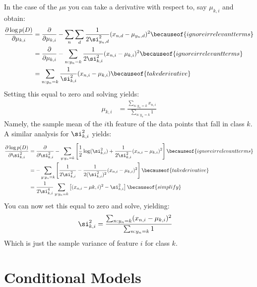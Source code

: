 In the case of the $\mu$s you can take a derivative with respect to,
say $\mu_{k,i}$ and obtain:
%
\begin{align}
   \frac {\partial \log p(D)} {\partial \mu_{k,i}}
&= \frac {\partial} {\partial \mu_{k,i}}
     - \sum_n \sum_d \frac 1 {2 \si_{y_n,d}^2} (x_{n,d} - \mu_{y_n,d})^2
   \becauseof{ignore irrelevant terms} \\
&= \frac {\partial} {\partial \mu_{k,i}}
     - \sum_{n:y_n=k} \frac 1 {2 \si_{k,i}^2} (x_{n,i} - \mu_{k,i})^2
   \becauseof{ignore irrelevant terms} \\
&= \sum_{n:y_n=k} \frac 1 {\si_{k,i}^2} (x_{n,i} - \mu_{k,i})
   \becauseof{take derivative}
\end{align}
%
Setting this equal to zero and solving yields:
%
\begin{align}
  \mu_{k,i} &= \frac {\sum_{n:y_n=k} x_{n,i}} {\sum_{n:y_n=k} 1}
\end{align}
%
Namely, the sample mean of the $i$th feature of the data points that
fall in class $k$.  A similar analysis for $\si_{k,i}^2$ yields:
%
\begin{align}
   \frac {\partial \log p(D)} {\partial \si^2_{k,i}}
&= \frac {\partial} {\partial \si^2_{k,i}}
     - \sum_{y:y_n=k} \left[ \frac 1 2 \log(\si_{k,i}^2) +
                            \frac 1 {2 \si_{k,i}^2} (x_{n,i} - \mu_{k,i})^2\right]
   \becauseof{ignore irrelevant terms} \\
&= - \sum_{y:y_n=k} \left[
       \frac 1 {2 \si_{k,i}^2}
     - \frac 1 {2 (\si_{k,i}^2)^2} (x_{n,i} - \mu_{k,i})^2 \right]
   \becauseof{take derivative} \\
&= \frac 1 {2 \si_{k,i}^4} \sum_{y:y_n=k} \left[ (x_{n,i} - \mu{k,i})^2 - \si_{k,i}^2 \right]
   \becauseof{simplify}
\end{align}
%
You can now set this equal to zero and solve, yielding:
%
\begin{align}
  \si_{k,i}^2 &=
    \frac {\sum_{n:y_n=k} (x_{n,i}-\mu_{k,i})^2} {\sum_{n:y_n=k} 1}
\end{align}
%
Which is just the sample variance of feature $i$ for class $k$.


\section{Conditional Models}

